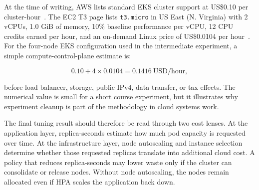 \documentclass[conference]{IEEEtran}
\begin{document}
\begin{table}[ht]
\centering
\caption{Cost components relevant to the EKS experiment}
\label{tab:cost-components}
\end{table}

At the time of writing, AWS lists standard EKS cluster support at US\$0.10 per cluster-hour~\cite{aws_eks_pricing}. The EC2 T3 page lists \texttt{t3.micro} in US East (N. Virginia) with 2 vCPUs, 1.0 GiB of memory, 10\% baseline performance per vCPU, 12 CPU credits earned per hour, and an on-demand Linux price of US\$0.0104 per hour~\cite{aws_ec2_t3}. For the four-node EKS configuration used in the intermediate experiment, a simple compute-control-plane estimate is:

\begin{equation}
0.10 + 4 \times 0.0104 = 0.1416\ \mathrm{USD/hour},
\end{equation}

before load balancer, storage, public IPv4, data transfer, or tax effects. The numerical value is small for a short course experiment, but it illustrates why experiment cleanup is part of the methodology in cloud systems work.

The final tuning result should therefore be read through two cost lenses. At the application layer, replica-seconds estimate how much pod capacity is requested over time. At the infrastructure layer, node autoscaling and instance selection determine whether those requested replicas translate into additional cloud cost. A policy that reduces replica-seconds may lower waste only if the cluster can consolidate or release nodes. Without node autoscaling, the nodes remain allocated even if HPA scales the application back down.
\end{document}
